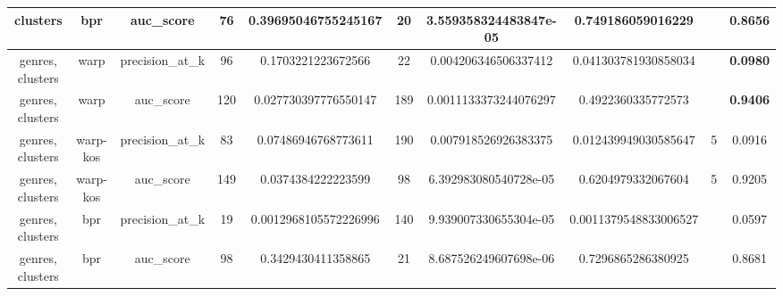 \begin{table}
{\begin{tabular}{|c|c|c|c|c|c|c|c|c|c|}
\hline
clusters                  & bpr                   & auc\_score                & 76     & 0.39695046755245167   & 20            & 3.559358324483847e-05  & 0.749186059016229     &      & 0.8656                    \\ 
\hline
genres, clusters          & warp                  & precision\_at\_k          & 96     & 0.1703221223672566    & 22            & 0.004206346506337412   & 0.041303781930858034  &      & \textbf{0.0980}                    \\ 
\hline
genres, clusters          & warp                  & auc\_score                & 120    & 0.027730397776550147  & 189           & 0.0011133373244076297  & 0.4922360335772573    &      & \textbf{0.9406}                    \\ 
\hline
genres, clusters          & warp-kos              & precision\_at\_k          & 83     & 0.07486946768773611   & 190           & 0.007918526926383375   & 0.012439949030585647  & 5    & 0.0916                    \\ 
\hline
genres, clusters          & warp-kos              & auc\_score                & 149    & 0.0374384222223599    & 98            & 6.392983080540728e-05  & 0.6204979332067604    & 5    & 0.9205                    \\ 
\hline
genres, clusters          & bpr                   & precision\_at\_k          & 19     & 0.0012968105572226996 & 140           & 9.939007330655304e-05  & 0.0011379548833006527 &      & 0.0597                    \\ 
\hline
genres, clusters          & bpr                   & auc\_score                & 98     & 0.3429430411358865    & 21            & 8.687526249607698e-06  & 0.7296865286380925    &      & 0.8681                    \\
\hline
\end{tabular}}
\end{table}

